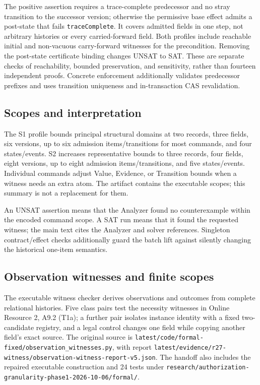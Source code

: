 \documentclass[11pt,a4paper]{article}
\newcommand{\code}[1]{\nolinkurl{#1}}
\begin{document}
The positive assertion requires a trace-complete predecessor and no stray transition to the successor version; otherwise the permissive base effect admits a post-state that fails \code{traceComplete}. It covers admitted fields in one step, not arbitrary histories or every carried-forward field. Both profiles include reachable initial and non-vacuous carry-forward witnesses for the precondition. Removing the post-state certificate binding changes UNSAT to SAT. These are separate checks of reachability, bounded preservation, and sensitivity, rather than fourteen independent proofs. Concrete enforcement additionally validates predecessor prefixes and uses transition uniqueness and in-transaction CAS revalidation.

\subsection{Scopes and interpretation}

The S1 profile bounds principal structural domains at two records, three fields, six versions, up to six admission items/transitions for most commands, and four states/events. S2 increases representative bounds to three records, four fields, eight versions, up to eight admission items/transitions, and five states/events. Individual commands adjust Value, Evidence, or Transition bounds when a witness needs an extra atom. The artifact contains the executable scopes; this summary is not a replacement for them.



An UNSAT assertion means that the Analyzer found no counterexample within the encoded command scope. A SAT run means that it found the requested witness; the main text cites the Analyzer and solver references. Singleton contract/effect checks additionally guard the batch lift against silently changing the historical one-item semantics.


\subsection{Observation witnesses and finite scopes}

The executable witness checker derives observations and outcomes from complete relational histories. Five class pairs test the necessity witnesses in Online Resource 2, A9.2 (T1a); a further pair isolates instance identity with a fixed two-candidate registry, and a legal control changes one field while copying another field's exact source. The original source is \code{latest/code/formal-fixed/observation_witnesses.py}, with report \code{latest/evidence/r27-witness/observation-witness-report-v5.json}. The handoff also includes the repaired executable construction and 24 tests under \code{research/authorization-granularity-phase1-2026-10-06/formal/}.
\end{document}
